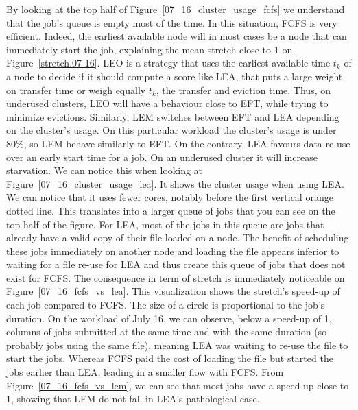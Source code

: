 \documentclass[conference,10pt]{IEEEtran}
\begin{document}
By looking at the top half of Figure~\ref{07_16_cluster_usage_fcfs}
we understand that the job's queue is empty most of the time.
In this situation, FCFS is very efficient. Indeed, the earliest available node will in
most cases be a node that can immediately start the job, explaining the mean stretch close to 1 on Figure~\ref{stretch.07-16}.
LEO is a strategy that uses the earliest available time $t_k$ of a node to decide if it should compute a score like LEA,
that puts a large weight on transfer time or weigh equally $t_k$, the transfer and eviction time. 
Thus, on underused clusters, LEO will have a behaviour close to EFT, while trying to minimize evictions.
Similarly, LEM switches between EFT and LEA depending on the cluster's usage.
On this particular workload the cluster's usage is under 80\%, so LEM behave similarly to EFT.
On the contrary, LEA favours data re-use over an early start time for a job.
On an underused cluster it will increase starvation.
We can notice this when looking at
Figure~\ref{07_16_cluster_usage_lea}. It shows the cluster usage when using LEA.
We can notice that it uses fewer cores, notably before the first vertical orange dotted line. 
This translates into a larger queue of jobs that you can see on the top half of the figure.
For LEA, most of the jobs in this queue are jobs that already have a valid copy of their file loaded on a node. 
The benefit of scheduling these jobs immediately on another node and loading the file appears
inferior to waiting for a file re-use for LEA and thus create this queue of jobs that does not exist for FCFS. 
The consequence in term of stretch is immediately noticeable on Figure~\ref{07_16_fcfs_vs_lea}.
This visualization shows the stretch's speed-up of each job compared to FCFS.
The size of a circle is proportional to the job's duration.
On the workload of July 16, we can observe, below a speed-up of 1, columns of jobs submitted at the same time and
with the same duration (so probably jobs using the same file),
meaning LEA was waiting to re-use the file to start the jobs.
Whereas FCFS paid the cost of loading the file but started the jobs earlier than LEA, leading in a 
smaller flow with FCFS.
From Figure~\ref{07_16_fcfs_vs_lem}, we can see that most jobs have a speed-up close to 1, showing 
that LEM do not fall in LEA's pathological case.
\end{document}
